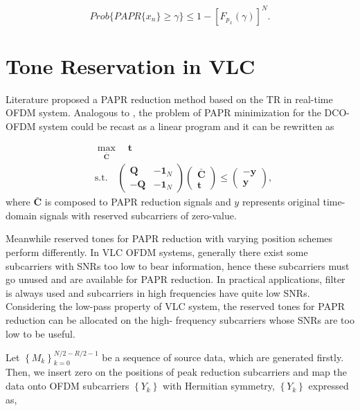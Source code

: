 \documentclass[9pt,twocolumn,twoside]{osajnl}
\begin{document}
\begin{equation}
  Prob\{PAPR\{x_n\} \geq \gamma\} \leq 1-{\left[F_{p_x}\left(\gamma\right)\right]}^N.
\end{equation}

\section{Tone Reservation in VLC}

Literature \cite{tellado2006multicarrier} proposed a PAPR reduction method based on the TR in real-time OFDM system. Analogous to \cite{yu2015low}, the problem of PAPR minimization for the DCO-OFDM system could 
be recast as a linear program and it can be rewritten as

\begin{align}
  & \max\limits_{\bar{\mathbf{C}}} \quad \mathbf{t} \\
  & \textrm{s.t.} \quad
  \left( \begin{array}{cc}
    \mathbf{Q} & -\mathbf{1}_N \\
    -\mathbf{Q} & -\mathbf{1}_N
  \end{array} \right)
  \left( \begin{array}{c}
    \bar{\mathbf{C}} \\
    \mathbf{t}
  \end{array} \right)
  \leq
  \left( \begin{array}{c}
    -\mathbf{y} \\
    \mathbf{y}
  \end{array} \right),
  \label{eq:optimization}
\end{align}
where $\bar{\mathbf{C}}$ is composed to PAPR reduction signals and $y$ represents original time-domain signals with reserved subcarriers of zero-value.

Meanwhile reserved tones for PAPR reduction with varying position schemes perform differently.
In VLC OFDM systems, generally there exist some subcarriers with SNRs too low to bear information, hence these subcarriers must go 
unused and are available for PAPR reduction. In practical applications, filter is always used and subcarriers in high frequencies 
have quite low SNRs. Considering the low-pass property of VLC system, the reserved tones for PAPR reduction can be allocated on the high-
frequency subcarriers whose SNRs are too low to be useful.

Let ${\left\{M_k\right\}}_{k=0}^{N/2-R/2-1}$ be a sequence of 
source data, which are generated firstly. Then, we insert zero on the positions of peak reduction subcarriers and map the data onto OFDM subcarriers $\left\{Y_k\right\}$ 
with Hermitian symmetry, $\left\{Y_k\right\}$ expressed as,
\end{document}
